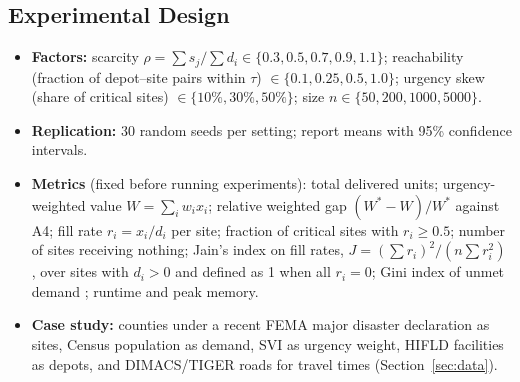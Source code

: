 \documentclass[11pt]{article}
\begin{document}
\subsection{Experimental Design}
\begin{itemize}
  \item \textbf{Factors:} scarcity $\rho = \sum s_j / \sum d_i \in
        \{0.3, 0.5, 0.7, 0.9, 1.1\}$; reachability (fraction of depot--site
        pairs within $\tau$) $\in \{0.1, 0.25, 0.5, 1.0\}$; urgency skew
        (share of critical sites) $\in \{10\%, 30\%, 50\%\}$; size
        $n \in \{50, 200, 1000, 5000\}$.
  \item \textbf{Replication:} 30 random seeds per setting; report means with
        95\% confidence intervals.
  \item \textbf{Metrics} (fixed before running experiments): total
        delivered units; urgency-weighted value $W = \sum_i w_i x_i$;
        relative weighted gap $(W^* - W)/W^*$ against A4; fill rate
        $r_i = x_i/d_i$ per site; fraction of critical sites with
        $r_i \ge 0.5$; number of sites receiving nothing; Jain's index on fill
        rates, $J = (\sum r_i)^2/(n\sum r_i^2)$ \cite{jain1984}, over sites
        with $d_i > 0$ and defined as 1 when all $r_i = 0$; Gini index of
        unmet demand \cite{mostajabdaveh2025}; runtime and peak memory.
  \item \textbf{Case study:} counties under a recent FEMA major disaster
        declaration as sites, Census population as demand, SVI as urgency
        weight, HIFLD facilities as depots, and DIMACS/TIGER roads for travel
        times (Section~\ref{sec:data}).
\end{itemize}
\end{document}
